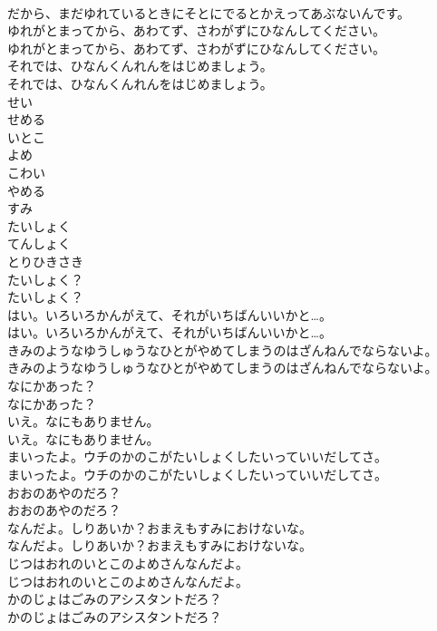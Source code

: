 \documentclass[8pt]{extreport}
\begin{document}
\begin{CJK}{UTF8}{min}
\\	だから、まだゆれているときにそとにでるとかえってあぶないんです。 
\\	ゆれがとまってから、あわてず、さわがずにひなんしてください。	
\\	ゆれがとまってから、あわてず、さわがずにひなんしてください。 
\\	それでは、ひなんくんれんをはじめましょう。	
\\	それでは、ひなんくんれんをはじめましょう。 
\\	せい
\\	せめる
\\	いとこ
\\	よめ
\\	こわい
\\	やめる
\\	すみ
\\	たいしょく
\\	てんしょく
\\	とりひきさき
\\	たいしょく？	
\\	たいしょく？ 
\\	はい。いろいろかんがえて、それがいちばんいいかと…。	
\\	はい。いろいろかんがえて、それがいちばんいいかと…。 
\\	きみのようなゆうしゅうなひとがやめてしまうのはざんねんでならないよ。	
\\	きみのようなゆうしゅうなひとがやめてしまうのはざんねんでならないよ。 
\\	なにかあった？	
\\	なにかあった？ 
\\	いえ。なにもありません。	
\\	いえ。なにもありません。 
\\	まいったよ。ウチのかのこがたいしょくしたいっていいだしてさ。	
\\	まいったよ。ウチのかのこがたいしょくしたいっていいだしてさ。 
\\	おおのあやのだろ？	
\\	おおのあやのだろ？ 
\\	なんだよ。しりあいか？おまえもすみにおけないな。	
\\	なんだよ。しりあいか？おまえもすみにおけないな。 
\\	じつはおれのいとこのよめさんなんだよ。	
\\	じつはおれのいとこのよめさんなんだよ。 
\\	かのじょはごみのアシスタントだろ？	
\\	かのじょはごみのアシスタントだろ？ 

\end{CJK}
\end{document}
